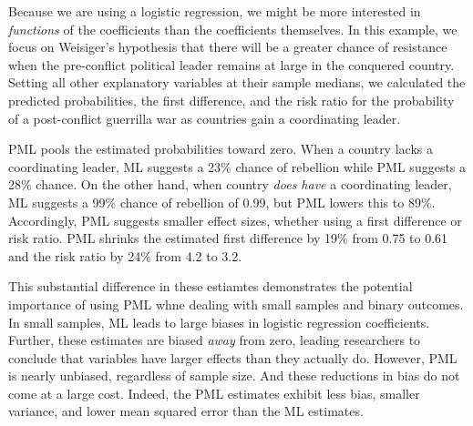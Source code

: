 \documentclass[12pt]{article}
\begin{document}

Because we are using a logistic regression, we might be more interested in \textit{functions} of the coefficients than the coefficients themselves. 
In this example, we focus on Weisiger's hypothesis that there will be a greater chance of resistance when the pre-conflict political leader remains at large in the conquered country.
Setting all other explanatory variables at their sample medians, we calculated the predicted probabilities, the first difference, and the risk ratio for the probability of a post-conflict guerrilla war as countries gain a coordinating leader.
 
%

PML pools the estimated probabilities toward zero. 
When a country lacks a coordinating leader, ML suggests a 23\% chance of rebellion while PML suggests a 28\% chance. 
On the other hand, when country \textit{does have} a coordinating leader, ML suggests a 99\% chance of rebellion of 0.99, but PML lowers this to 89\%. 
Accordingly, PML suggests smaller effect sizes, whether using a first difference or risk ratio. 
PML shrinks the estimated first difference by 19\% from 0.75 to 0.61 and the risk ratio by 24\% from 4.2 to 3.2.

This substantial difference in these estiamtes demonstrates the potential importance of using PML whne dealing with small samples and binary outcomes.
In small samples, ML leads to large biases in logistic regression coefficients. 
Further, these estimates are biased \textit{away} from zero, leading researchers to conclude that variables have larger effects than they actually do. 
However, PML is nearly unbiased, regardless of sample size. 
And these reductions in bias do not come at a large cost. 
Indeed, the PML estimates exhibit less bias, smaller variance, and lower mean squared error than the ML estimates.
\end{document}

